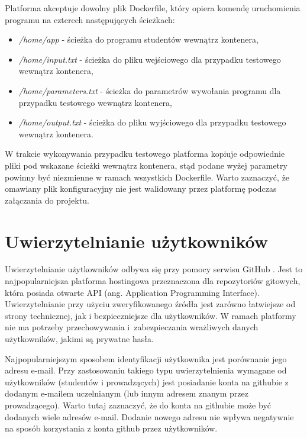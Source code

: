 Platforma akceptuje dowolny plik Dockerfile, który opiera komendę uruchomienia programu na czterech następujących ścieżkach:
\begin{itemize}
    \item \textit{/home/app} - ścieżka do programu studentów wewnątrz kontenera,
    \item \textit{/home/input.txt} - ścieżka do pliku wejściowego dla przypadku testowego wewnątrz kontenera,
    \item \textit{/home/parameters.txt} - ścieżka do parametrów wywołania programu dla przypadku testowego wewnątrz kontenera,
    \item \textit{/home/output.txt} - ścieżka do pliku wyjściowego dla przypadku testowego wewnątrz kontenera.
\end{itemize}

W trakcie wykonywania przypadku testowego platforma kopiuje odpowiednie pliki pod wskazane ścieżki wewnątrz kontenera, stąd podane wyżej parametry powinny być niezmienne w ramach wszystkich Dockerfile.
Warto zaznaczyć, że omawiany plik konfiguracyjny nie jest walidowany przez platformę podczas załączania do projektu.


\section {Uwierzytelnianie użytkowników}
\label{authorization}

Uwierzytelnianie użytkowników odbywa się przy pomocy serwisu GitHub \cite{gitHub}.
Jest to najpopularniejsza platforma hostingowa przeznaczona dla repozytoriów gitowych, która posiada otwarte API (ang. Application Programming Interface).
Uwierzytelnianie przy użyciu zweryfikowanego źródła jest zarówno łatwiejsze od strony technicznej, jak i bezpieczniejsze dla użytkowników.
W ramach platformy nie ma potrzeby przechowywania i~zabezpieczania wrażliwych danych użytkowników, jakimi są prywatne hasła.

Najpopularniejszym sposobem identyfikacji użytkownika jest porównanie jego adresu e-mail.
Przy zastosowaniu takiego typu uwierzytelnienia wymagane od użytkowników (studentów i prowadzących) jest posiadanie konta na githubie z dodanym e-mailem uczelnianym (lub innym adresem znanym przez prowadzącego).
Warto tutaj zaznaczyć, że do konta na githubie może być dodanych wiele adresów e-mail.
Dodanie nowego adresu nie wpływa negatywnie na sposób korzystania z konta github przez użytkowników.

